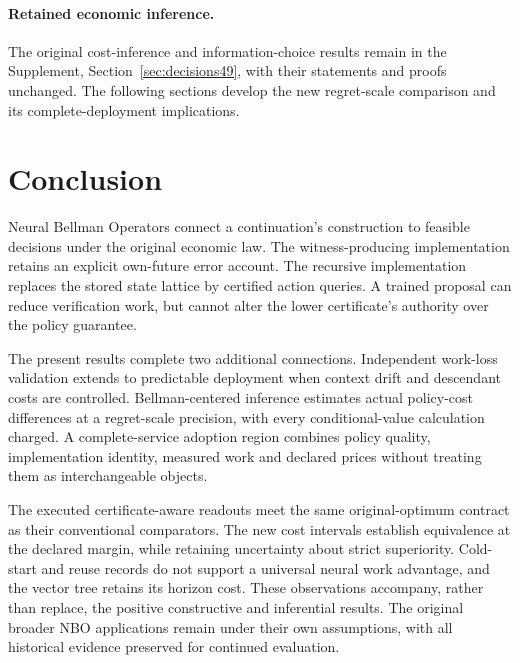\documentclass[ecta,nameyear,draft]{econsocart}
\begin{document}








\paragraph{Retained economic inference.} The original cost-inference and information-choice results remain in the Supplement, Section~\ref{sec:decisions49}, with their statements and proofs unchanged. The following sections develop the new regret-scale comparison and its complete-deployment implications.



\section{Conclusion}\label{sec:conclusion65}
Neural Bellman Operators connect a continuation's construction to feasible decisions under the original economic law. The witness-producing implementation retains an explicit own-future error account. The recursive implementation replaces the stored state lattice by certified action queries. A trained proposal can reduce verification work, but cannot alter the lower certificate's authority over the policy guarantee.

The present results complete two additional connections. Independent work-loss validation extends to predictable deployment when context drift and descendant costs are controlled. Bellman-centered inference estimates actual policy-cost differences at a regret-scale precision, with every conditional-value calculation charged. A complete-service adoption region combines policy quality, implementation identity, measured work and declared prices without treating them as interchangeable objects.

The executed certificate-aware readouts meet the same original-optimum contract as their conventional comparators. The new cost intervals establish equivalence at the declared margin, while retaining uncertainty about strict superiority. Cold-start and reuse records do not support a universal neural work advantage, and the vector tree retains its horizon cost. These observations accompany, rather than replace, the positive constructive and inferential results. The original broader NBO applications remain under their own assumptions, with all historical evidence preserved for continued evaluation.



\end{document}
